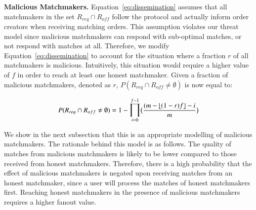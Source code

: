 
\textbf{Malicious Matchmakers.}
Equation~\ref{eq:dissemination} assumes that all matchmakers in the set $ R_{req} \cap R_{off} $ follow the protocol and actually inform order creators when receiving matching orders.
This assumption violates our threat model since malicious matchmakers can respond with sub-optimal matches, or not respond with matches at all.
Therefore, we modify Equation~\ref{eq:dissemination} to account for the situation where a fraction $ r $ of all matchmakers is malicious.
Intuitively, this situation would require a higher value of $ f $ in order to reach at least one honest matchmaker.
Given a fraction of malicious matchmakers, denoted as $ r $, $ P(R_{req} \cap R_{off} \neq \emptyset) $ is now equal to:

\begin{equation}
P(R_{req} \cap R_{off} \neq \emptyset) = 1 - \mathlarger{\prod}_{i=0}^{f-1} \big(\frac{(m - \left \lfloor{(1-r)f}\right \rfloor - i}{m}\big)
\label{eq:malicious_dissemination}
\end{equation}

We show in the next subsection that this is an appropriate modelling of malicious matchmakers.
The rationale behind this model is as follows.
The quality of matches from malicious matchmakers is likely to be lower compared to those received from honest matchmakers.
Therefore, there is a high probability that the effect of malicious matchmakers is negated upon receiving matches from an honest matchmaker, since a user will process the matches of honest matchmakers first.
Reaching honest matchmakers in the presence of malicious matchmakers requires a higher fanout value.

